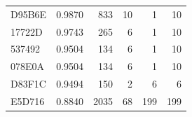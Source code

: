 \begin{table}[ht]
\begin{tabular}{lrrrrr}
 D95B6E & 0.9870 &   833 &    10 &     1 &    10 \\
 17722D & 0.9743 &   265 &     6 &     1 &    10 \\
 537492 & 0.9504 &   134 &     6 &     1 &    10 \\
 078E0A & 0.9504 &   134 &     6 &     1 &    10 \\
 D83F1C & 0.9494 &   150 &     2 &     6 &     6 \\
 E5D716 & 0.8840 &  2035 &    68 &   199 &   199 \\ 
   \bottomrule
 \end{tabular}
 \label{tab:simidroid-outputs}
\end{table}


